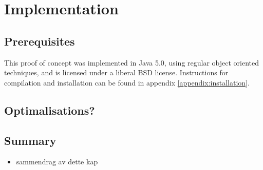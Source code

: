 \chapter{Implementation}
\label{chapter:implementation}
\section{Prerequisites}
This proof of concept was implemented in Java 5.0, using regular object
oriented techniques, and is licensed under a liberal BSD license. Instructions
for compilation and installation can be found in appendix
\ref{appendix:installation}.









\section{Optimalisations?}

\section{Summary}
\label{sect:impl:summary}
\begin{itemize}
  \item sammendrag av dette kap
\end{itemize}